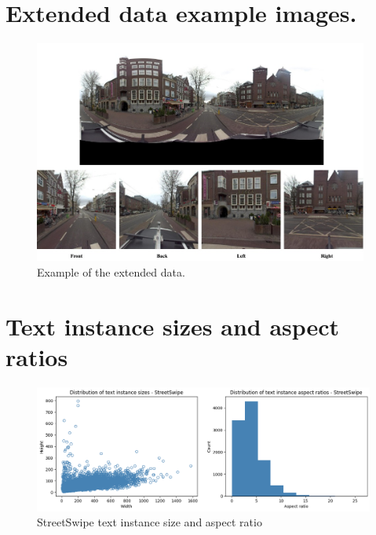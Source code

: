 \onecolumn

\appendix
\begin{appendices}

\section{Extended data example images.}
\label{sec:apx:appendix1}

\begin{figure}[H]
    \centering
    \includegraphics[width=0.98\textwidth]{media/methodology/data_ex/extended/pano_example.jpg}
    \caption{Example of the extended data.}
\end{figure}

\section{Text instance sizes and aspect ratios}
\label{sec:apx:appendix2}

\begin{figure}[H]
    \centering
    \includegraphics[width=\textwidth]{media/methodology/SS_ins_sz.png}
    \caption{StreetSwipe text instance size and aspect ratio}
    \label{fig:SS_ins_sz}
\end{figure}


\end{appendices}
